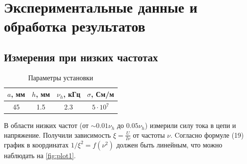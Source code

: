 \section*{Экспериментальные данные и обработка результатов}
\subsection*{Измерения при низких частотах}
\begin{table}
    \centering
    \begin{tabular}{|c|c|c|c|}
        \hline
        $a$, мм & $h$, мм & $\nu_h$, кГц & $\sigma$, См/м\\\hline
        45 & 1.5 & 2.3 & $5\cdot 10^7$\\\hline
    \end{tabular}
    \caption{Параметры установки}
\end{table}
\indent В области низких частот (от $\sim 0.01\nu_h$ до $0.05\nu_h$) измерили силу тока в цепи и напряжение. Получили зависимость $\xi = \frac{U}{I\nu}$ от частоты $\nu$. Cогласно формуле (19) график в координатах $1/\xi^2 = f(\nu^2)$ должен быть линейным, что можно наблюдать на \ref{fig:plot1}.
